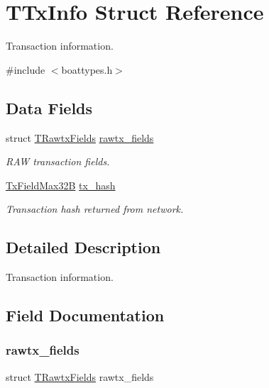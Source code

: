 \hypertarget{struct_t_tx_info}{}\section{T\+Tx\+Info Struct Reference}
\label{struct_t_tx_info}


Transaction information.  




{\ttfamily \#include $<$boattypes.\+h$>$}

\subsection*{Data Fields}
\begin{DoxyCompactItemize}
\item 
struct \mbox{\hyperlink{struct_t_rawtx_fields}{T\+Rawtx\+Fields}} \mbox{\hyperlink{struct_t_tx_info_aec2c986d1770cd8067f37723783f1959}{rawtx\+\_\+fields}}
\begin{DoxyCompactList}\small\item\em R\+AW transaction fields. \end{DoxyCompactList}\item 
\mbox{\hyperlink{boattypes_8h_af8a3635bb5261915dff042bd32f3466b}{Tx\+Field\+Max32B}} \mbox{\hyperlink{struct_t_tx_info_a9fa44cd0e482e25867a6521688eca3e0}{tx\+\_\+hash}}
\begin{DoxyCompactList}\small\item\em Transaction hash returned from network. \end{DoxyCompactList}\end{DoxyCompactItemize}


\subsection{Detailed Description}
Transaction information. 

\subsection{Field Documentation}
\mbox{\label{struct_t_tx_info_aec2c986d1770cd8067f37723783f1959}} 
\subsubsection{\texorpdfstring{rawtx\+\_\+fields}{rawtx\_fields}}
{\footnotesize\ttfamily struct \mbox{\hyperlink{struct_t_rawtx_fields}{T\+Rawtx\+Fields}} rawtx\+\_\+fields}



